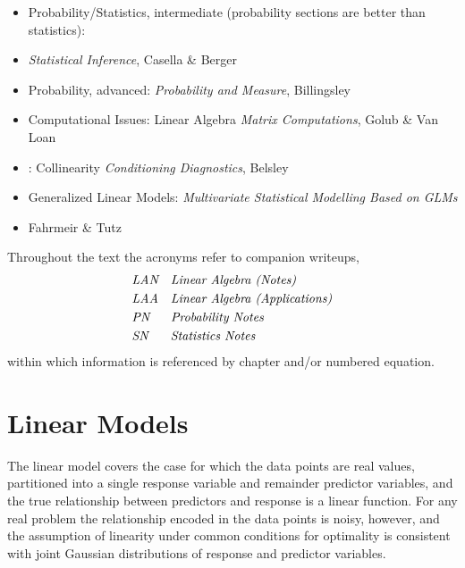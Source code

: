 \documentclass[12pt, twoside, draft]{article}
\begin{document}
\begin{itemize}[noitemsep]
\item Probability/Statistics, intermediate (probability sections are better than statistics):\hspace{50pt}
\item[] \hspace{200pt} \textit{Statistical Inference}, Casella \& Berger
\item Probability, advanced: \hspace{97pt} \textit{Probability and Measure}, Billingsley
\item Computational Issues: Linear Algebra \hspace{29pt} \textit{Matrix Computations}, Golub \& Van Loan
\item[] \hspace{94pt}: Collinearity \hspace{43pt} \textit{Conditioning Diagnostics}, Belsley
\item Generalized Linear Models: \hspace{74pt} \textit{Multivariate Statistical Modelling Based on GLMs}
\item[] \hspace{345pt} Fahrmeir \& Tutz
\end{itemize}

Throughout the text the acronyms refer to companion writeups,
\begin{align}
&\textit{LAN} \hspace{10pt} \textit{Linear Algebra (Notes)} \notag \\
&\textit{LAA} \hspace{10pt} \textit{Linear Algebra (Applications)} \notag \\
&\textit{PN} \hspace{17pt} \textit{Probability Notes} \notag \\
&\textit{SN} \hspace{18pt} \textit{Statistics Notes} \notag
\end{align}
within which information is referenced by chapter and/or numbered equation.

\section{Linear Models}\label{sec:linear_models}
The linear model covers the case for which the data points are real values, partitioned into a single response variable and remainder predictor variables, and the true relationship between predictors and response is a linear function.  For any real problem the relationship encoded in the data points is noisy, however, and the assumption of linearity under common conditions for optimality is consistent with joint Gaussian distributions of response and predictor variables. 
\end{document}

